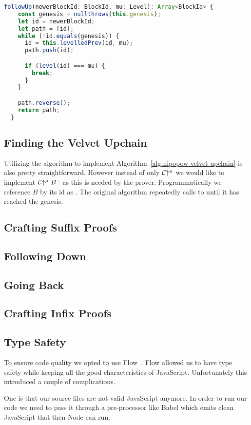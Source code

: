 \begin{lstlisting}[language=Javascript]
  followUp(newerBlockId: BlockId, mu: Level): Array<BlockId> {
    const genesis = nullthrows(this.genesis);
    let id = newerBlockId;
    let path = [id];
    while (!id.equals(genesis)) {
      id = this.levelledPrev(id, mu);
      path.push(id);

      if (level(id) === mu) {
        break;
      }
    }

    path.reverse();
    return path;
  }
\end{lstlisting}

\subsection{Finding the Velvet Upchain}
Utilizing the  algorithm to implement Algorithm~\ref{alg.nipopow-velvet-upchain} is also pretty straightforward. However instead of only $\mathcal{C} \negthickspace\uparrow^\mu$ we would like to implement $\mathcal{C}\negthickspace\uparrow^\mu{B:}$ as this is needed by the prover. Programmatically we reference $B$ by its id as  . The original algorithm repeatedly calls to  until it has reached the genesis. 

\subsection{Crafting Suffix Proofs}
\subsection{Following Down}
\subsection{Going Back}
\subsection{Crafting Infix Proofs}

\subsection{Type Safety}
To ensure code quality we opted to use Flow~\cite{flow}. Flow allowed us to have type safety while keeping all the good characteristics of JavaScript. Unfortunately this introduced a couple of complications.

One is that our source files are not valid JavaScript anymore. In order to run our code we need to pass it through a pre-processor like Babel which emits clean JavaScript that then Node can run.

